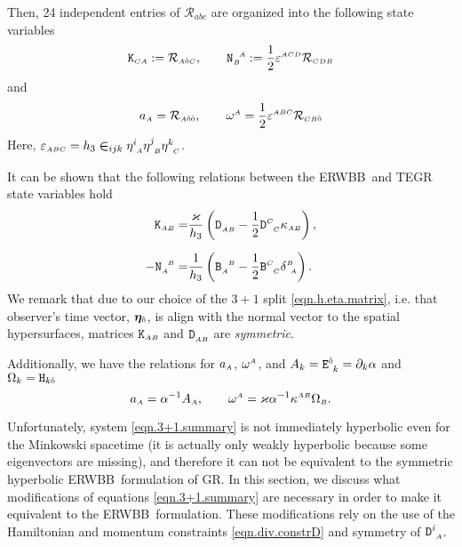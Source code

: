 \documentclass[
10pt, %
a4paper, %
oneside, %
headinclude,footinclude, %
BCOR5mm, %
]{scrartcl}
\newcommand{\ERWBB}{ERWBB}
\newcommand{\sA}{\mathsmaller A}
\newcommand{\sB}{\mathsmaller B}
\newcommand{\sC}{\mathsmaller C}
\newcommand{\sD}{\mathsmaller D}
\newcommand{\pd}[1]{\partial_{#1}}
\newcommand{\mg}[1]{\kappa_{#1}}			%
\newcommand{\MG}[1]{\kappa^{#1}}			%
\newcommand{\tetrsymbol}{h}
\newcommand{\itetrsymbol}{\eta}
\newcommand{\itetr}[2]{\itetrsymbol^{#1}_{\phantom{#1}#2}}
\newcommand{\detTetr}{\tetrsymbol}
\newcommand{\Dfin}[2]{\mathtt{D}_{\phantom{#2}#1}^{#2}}	%
\newcommand{\Hfin}[2]{\mathtt{H}_{#2#1}}	%
\newcommand{\Efin}[2]{\mathtt{E}^{#1}_{\phantom{#1}#2}}	%
\newcommand{\Kbuch}[2]{\mathtt{K}_{{#1}{#2}}}	%
\newcommand{\Nbuch}[2]{\mathtt{N}_{#1}^{\ \,#2}}	%
\newcommand{\Bfinmix}[2]{\mathtt{B}^{#1}_{\phantom{#1}#2}}	%
\newcommand{\Bfinmixx}[2]{\mathtt{B}_{#1}^{\phantom{#1}#2}}	%
\newcommand{\LCsymb}{\bm{\in}}    %
\newcommand{\LCtens}{\varepsilon} %
\newcommand{\KD}[2]{\delta^{#1}_{\ #2}}
\newcommand{\indalg}[1]{\hat{\mathsmaller{#1}}}
\newcommand{\lapse}{\alpha}
\begin{document}
Then, 24 independent entries of $ \mathcal{R}_{abc} $ are organized into the following state 
variables
\begin{equation}\label{eqn.KN}
	\Kbuch{\sC}{\sA} := \mathcal{R}_{\sA\indalg{0}\sC},
	\qquad
	\Nbuch{\sB}{\sA} := \frac{1}{2} \LCtens^{\sA\sC\sD}\mathcal{R}_{\sC\sD\sB}
\end{equation}
and 
\begin{equation}\label{eqn.aw}
	a_{\sA} = \mathcal{R}_{\sA\indalg{0}\indalg{0}},
	\qquad
	\omega^{\sA} = \frac{1}{2} \LCtens^{\sA\sB\sC} \mathcal{R}_{\sC\sB\indalg{0}}
\end{equation}
Here, $ \LCtens_{\sA\sB\sC} = 
\detTetr_3 \LCsymb_{ijk}\itetr{i}{\sA}\itetr{j}{\sB}\itetr{k}{\sC} $.

It can be shown that the following relations between the \ERWBB\ and TEGR state variables hold
\begin{subequations}\label{eqn.Buchman.TEGR.KN}
	\begin{align}
		\Kbuch{\sA}{\sB} = & \frac{\varkappa}{\detTetr_3} 
		\left(
		\Dfin{\sA\sB}{}-\frac{1}{2} \Dfin{\sC}{\sC} \mg{\sA\sB}
		\right),\\[2mm]
		-\Nbuch{\sA}{\sB} =&\frac{1}{\detTetr_3}
		\left(
		\Bfinmixx{\sA}{\sB} - \frac{1}{2}\Bfinmix{\sC}{\sC}\KD{\sB}{\sA}
		\right).
	\end{align}
\end{subequations}
We remark that due to our choice of the $ 3+1 $ split \eqref{eqn.h.eta.matrix}, i.e. that 
observer's time vector, $ \bm{\itetrsymbol}_{\indalg{0}} $, is align with the normal vector to the 
spatial hypersurfaces, matrices $ \Kbuch{\sA}{\sB} $ and $ \Dfin{\sA\sB}{} $ are \textit{symmetric}.

Additionally, we have the relations for $ a_{\sA} $, $ \omega^{\sA} $, and  $ 
A_{k}=\Efin{\indalg{0}}{k} = \pd{k}\lapse $ and $ 
\Omega_{k} = \Hfin{\indalg{0}}{k} $
\begin{equation}\label{eqn.Buchman.TEGR.AW}
	a_{\sA} = \lapse^{-1} A_{\sA},
	\qquad
	\omega^{\sA} = \varkappa \lapse^{-1} \MG{\sA\sB} \Omega_{\sB}.
\end{equation}


Unfortunately, system \eqref{eqn.3+1.summary} is not immediately hyperbolic even for the Minkowski 
spacetime (it is actually only weakly hyperbolic because some eigenvectors are missing), and 
therefore it can not be equivalent to the symmetric hyperbolic \ERWBB\ formulation 
of GR. In this section, we discuss what modifications of equations \eqref{eqn.3+1.summary} are 
necessary in order to make it equivalent to the \ERWBB\ formulation.
These modifications rely on the use of the Hamiltonian and momentum constraints 
\eqref{eqn.div.constrD} and symmetry of $ \Dfin{\sA}{i} $. 
\end{document}
